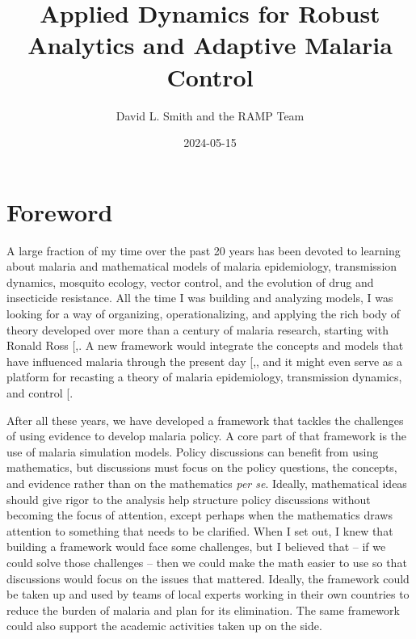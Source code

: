 \documentclass[
]{book}
\title{Applied Dynamics for Robust Analytics and Adaptive Malaria Control}
\author{David L. Smith and the RAMP Team}
\date{2024-05-15}
\begin{document}
\maketitle

{
\setcounter{tocdepth}{2}
\tableofcontents
}
\chapter*{Foreword}\label{foreword}

A large fraction of my time over the past 20 years has been devoted to learning about malaria and mathematical models of malaria epidemiology, transmission dynamics, mosquito ecology, vector control, and the evolution of drug and insecticide resistance.
All the time I was building and analyzing models, I was looking for a way of organizing, operationalizing, and applying the rich body of theory developed over more than a century of malaria research, starting with Ronald Ross {[},\citeproc{ref-SmithDL2012_RossMacdonald}{2}{]}.
A new framework would integrate the concepts and models that have influenced malaria through the present day {[},\citeproc{ref-SmithNR2018AgentbasedModels}{4}{]}, and it might even serve as a platform for recasting a theory of malaria epidemiology, transmission dynamics, and control {[}\citeproc{ref-SmithDL2014Recasting}{5}{]}.

After all these years, we have developed a framework that tackles the challenges of using evidence to develop malaria policy. A core part of that framework is the use of malaria simulation models.
Policy discussions can benefit from using mathematics, but discussions must focus on the policy questions, the concepts, and evidence rather than on the mathematics \emph{per se}.
Ideally, mathematical ideas should give rigor to the analysis help structure policy discussions without becoming the focus of attention, except perhaps when the mathematics draws attention to something that needs to be clarified.
When I set out, I knew that building a framework would face some challenges, but I believed that -- if we could solve those challenges -- then we could make the math easier to use so that discussions would focus on the issues that mattered.
Ideally, the framework could be taken up and used by teams of local experts working in their own countries to reduce the burden of malaria and plan for its elimination.
The same framework could also support the academic activities taken up on the side.
\end{document}
